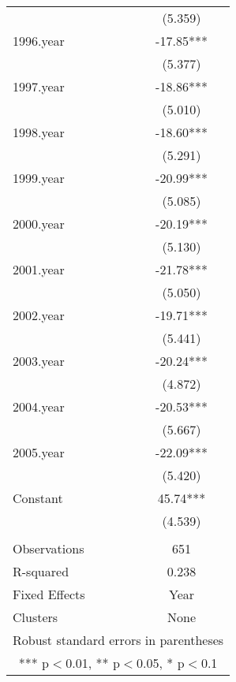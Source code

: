 \begin{tabular}{lc}
 & (5.359) \\
1996.year & -17.85*** \\
 & (5.377) \\
1997.year & -18.86*** \\
 & (5.010) \\
1998.year & -18.60*** \\
 & (5.291) \\
1999.year & -20.99*** \\
 & (5.085) \\
2000.year & -20.19*** \\
 & (5.130) \\
2001.year & -21.78*** \\
 & (5.050) \\
2002.year & -19.71*** \\
 & (5.441) \\
2003.year & -20.24*** \\
 & (4.872) \\
2004.year & -20.53*** \\
 & (5.667) \\
2005.year & -22.09*** \\
 & (5.420) \\
Constant & 45.74*** \\
 & (4.539) \\
 &  \\
Observations & 651 \\
R-squared & 0.238 \\
Fixed Effects & Year \\
 Clusters & None \\ \hline
\multicolumn{2}{c}{ Robust standard errors in parentheses} \\
\multicolumn{2}{c}{ *** p$<$0.01, ** p$<$0.05, * p$<$0.1} \\
\end{tabular}
